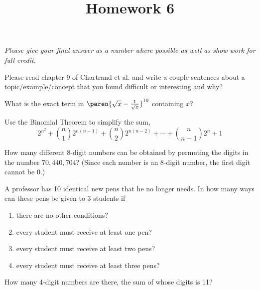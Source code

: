 \documentclass{homework}
\title{Homework 6}
\begin{document}
 \maketitle

\textit{Please give your final answer as a number where possible as well as show work for full credit.}

\question Please read chapter 9 of Chartrand et al. and write a couple sentences about a topic/example/concept that you found difficult or interesting and why?

\question{\label{q16}} What is the exact term in $\paren{\sqrt{x} - \frac{1}{\sqrt{x}}}^{10}$ containing $x$?

\question Use the Binomial Theorem to simplify the sum,
\[
    2^{n^2} + \binom{n}{1}2^{n(n-1)} + \binom{n}{2}2^{n(n-2)} + \cdots + \binom{n}{n-1}2^n + 1
\]

\question How many different 8-digit numbers can be obtained by permuting the digits in the number $70,440,704$? (Since each number is an 8-digit number, the first digit cannot be 0.)

\question A professor has 10 identical new pens that he no longer needs. In how many ways can these pens be given to 3 students if
\begin{enumerate}[label=(\alph*)]
    \item there are no other conditions?
    \item every student must receive at least one pen?
    \item every student must receive at least two pens?
    \item every student must receive at least three pens?
\end{enumerate}

\question How many 4-digit numbers are there, the sum of whose digits is 11?
\end{document}
